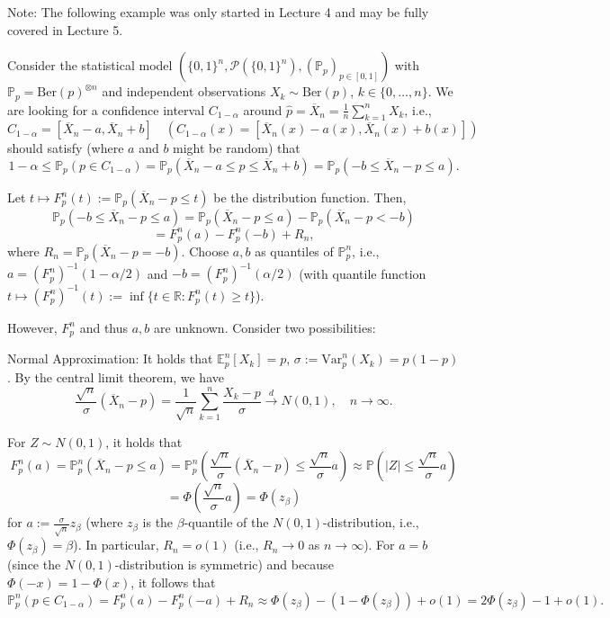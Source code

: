 \documentclass[open=any, 11pt,paper=A4]{scrreprt}
\begin{document}
Note: The following example was only started in Lecture 4 and may be fully covered in Lecture 5.

\begin{example}
Consider the statistical model \((\{0,1\}^n, \mathcal{P}(\{0,1\}^n), (\mathbb{P}_p)_{p \in [0,1]})\) with \(\mathbb{P}_p = \text{Ber}(p)^{\otimes n}\) and independent observations \(X_k \sim \text{Ber}(p)\), \( k \in \{0, \ldots, n\}\). We are looking for a confidence interval \( C_{1-\alpha} \) around \( \hat{p} = \overline{X}_n = \frac{1}{n} \sum_{k=1}^n X_k \), i.e.,
\[
C_{1-\alpha} = [\overline{X}_n - a, \overline{X}_n + b] \quad \left(C_{1-\alpha}(x) = [\overline{X}_n(x) - a(x), \overline{X}_n(x) + b(x)] \right)
\]
should satisfy (where \(a\) and \(b\) might be random) that
\[
1 - \alpha \leq \mathbb{P}_p \left( p \in C_{1-\alpha} \right) = \mathbb{P}_p \left( \overline{X}_n - a \leq p \leq \overline{X}_n + b \right) = \mathbb{P}_p \left(-b \leq \overline{X}_n - p \leq a \right).
\]

Let \(t \mapsto F_p^n(t) := \mathbb{P}_p \left( \overline{X}_n - p \leq t \right)\) be the distribution function. Then,
\[
\mathbb{P}_p \left(-b \leq \overline{X}_n - p \leq a \right) = \mathbb{P}_p \left( \overline{X}_n - p \leq a \right) - \mathbb{P}_p \left( \overline{X}_n - p < -b \right)
\]
\[
= F_p^n(a) - F_p^n(-b) + R_n,
\]
where \( R_n = \mathbb{P}_p \left( \overline{X}_n - p = -b \right) \). Choose \(a, b\) as quantiles of \(\mathbb{P}_p^n\), i.e., \(a = \left(F_p^n\right)^{-1}(1 - \alpha / 2)\) and \( -b = \left(F_p^n\right)^{-1}(\alpha / 2)\) (with quantile function \(t \mapsto \left(F_p^n\right)^{-1}(t) := \inf \{t \in \mathbb{R} : F_p^n(t) \geq t \}\)).

However, \(F_p^n\) and thus \(a, b\) are unknown. Consider two possibilities:

Normal Approximation: It holds that \( \mathbb{E}_p^n[X_k] = p \), \( \sigma := \text{Var}_p^n(X_k) = p(1 - p) \). By the central limit theorem, we have
\[
\frac{\sqrt{n}}{\sigma} \left( \overline{X}_n - p \right) = \frac{1}{\sqrt{n}} \sum_{k=1}^n \frac{X_k - p}{\sigma} \xrightarrow{d} N(0,1), \quad n \to \infty.
\]

For \( Z \sim N(0,1) \), it holds that
\[
F_p^n(a) = \mathbb{P}_p^n \left( \overline{X}_n - p \leq a \right) = \mathbb{P}_p^n \left( \frac{\sqrt{n}}{\sigma} \left( \overline{X}_n - p \right) \leq \frac{\sqrt{n}}{\sigma} a \right) \approx \mathbb{P}(|Z| \leq \frac{\sqrt{n}}{\sigma} a)
\]
\[
= \Phi \left( \frac{\sqrt{n}}{\sigma} a \right) = \Phi(z_\beta)
\]
for \( a := \frac{\sigma}{\sqrt{n}} z_\beta \) (where \( z_\beta \) is the \( \beta \)-quantile of the \( N(0,1) \)-distribution, i.e., \( \Phi(z_\beta) = \beta \)). In particular, \( R_n = o(1) \) (i.e., \( R_n \to 0 \) as \( n \to \infty \)). For \( a = b \) (since the \( N(0,1) \)-distribution is symmetric) and because \( \Phi(-x) = 1 - \Phi(x) \), it follows that
\[
\mathbb{P}_p^n(p \in C_{1-\alpha}) = F_p^n(a) - F_p^n(-a) + R_n \approx \Phi(z_\beta) - (1 - \Phi(z_\beta)) + o(1) = 2 \Phi(z_\beta) - 1 + o(1).
\]


\end{example}
\end{document}
